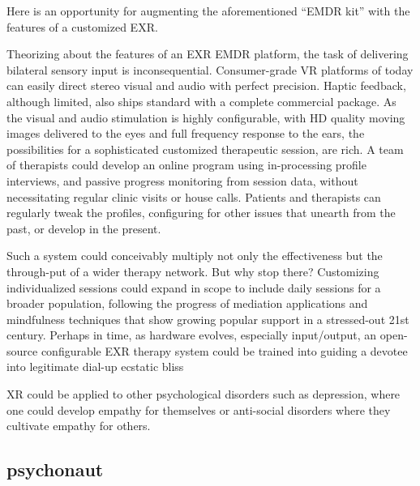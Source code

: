 \documentclass{UIdahoMastersThesis}
\begin{document}
Here is an opportunity for augmenting the aforementioned ``EMDR kit'' with the features of a customized EXR.

Theorizing about the features of an EXR EMDR platform, the task of delivering bilateral sensory input is inconsequential. Consumer-grade VR platforms of today can easily direct stereo visual and audio with perfect precision. Haptic feedback, although limited, also ships standard with a complete commercial package. As the visual and audio stimulation is highly configurable, with HD quality moving images delivered to the eyes and full frequency response to the ears, the possibilities for a sophisticated customized therapeutic session, are rich. A team of therapists could develop an online program using in-processing profile interviews, and passive progress monitoring from session data, without necessitating regular clinic visits or house calls. Patients and therapists can regularly tweak the profiles, configuring for other issues that unearth from the past, or develop in the present.

Such a system could conceivably multiply not only the effectiveness but the through-put of a wider therapy network. But why stop there? Customizing individualized sessions could expand in scope to include daily sessions for a broader population, following the progress of mediation applications and mindfulness techniques that show growing popular support in a stressed-out 21st century. Perhaps in time, as hardware evolves, especially input/output, an open-source configurable EXR therapy system could be trained into guiding a devotee into legitimate dial-up ecstatic bliss

XR could be applied to other psychological disorders such as depression, where one could develop empathy for themselves or anti-social disorders where they cultivate empathy for others.

\subsection{psychonaut}
\end{document}
